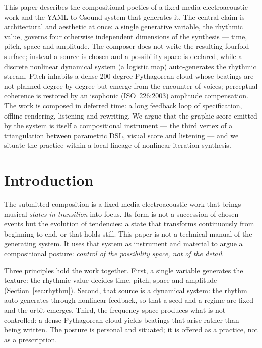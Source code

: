 \documentclass{article}
\title{\papertitle}
\begin{document}
\maketitle

\abstract
This paper describes the compositional poetics of a fixed-media electroacoustic
work and the YAML-to-Csound system that generates it. The central claim is
architectural and aesthetic at once: a single generative variable, the rhythmic
value, governs four otherwise independent dimensions of the synthesis --- time,
pitch, space and amplitude. The composer does not write the resulting fourfold
surface; instead a source is chosen and a possibility space is declared, while a
discrete nonlinear dynamical system (a logistic map) auto-generates the rhythmic
stream. Pitch inhabits a dense 200-degree Pythagorean cloud whose beatings are
not planned degree by degree but emerge from the encounter of voices; perceptual
coherence is restored by an isophonic (ISO~226:2003) amplitude compensation. The
work is composed in deferred time: a long feedback loop of specification, offline
rendering, listening and rewriting. We argue that the graphic score emitted by
the system is itself a compositional instrument --- the third vertex of a
triangulation between parametric DSL, visual score and listening --- and we
situate the practice within a local lineage of nonlinear-iteration synthesis.
\endabstract

\section{Introduction}\label{sec:introduction}

The submitted composition is a fixed-media electroacoustic work that brings
musical \emph{states in transition} into focus. Its form is not a succession of
chosen events but the evolution of tendencies: a state that transforms
continuously from beginning to end, or that holds still. This paper is not a
technical manual of the generating system. It uses that system as instrument and
material to argue a compositional posture: \emph{control of the possibility
space, not of the detail}.

Three principles hold the work together. First, a single variable generates the
texture: the rhythmic value decides time, pitch, space and amplitude
(Section~\ref{sec:rhythm}). Second, that source is a dynamical system: the
rhythm auto-generates through nonlinear feedback, so that a seed and a regime
are fixed and the orbit emerges. Third, the frequency space produces what is not
controlled: a dense Pythagorean cloud yields beatings that arise rather than
being written. The posture is personal and situated; it is offered as a
practice, not as a prescription.
\end{document}
